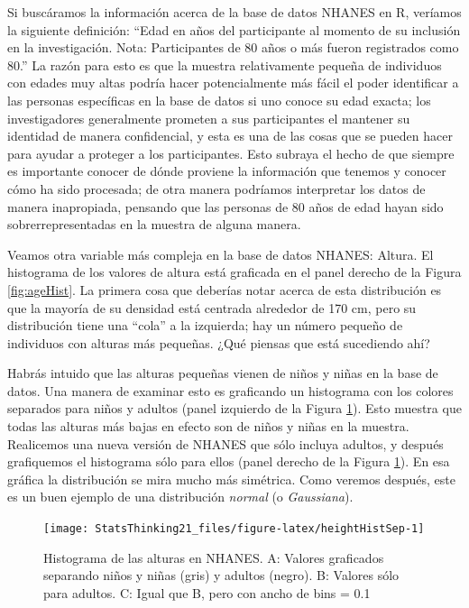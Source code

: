 \documentclass[
  12pt,
]{book}
\begin{document}
Si buscáramos la información acerca de la base de datos NHANES en R, veríamos la siguiente definición: ``Edad en años del participante al momento de su inclusión en la investigación. Nota: Participantes de 80 años o más fueron registrados como 80.'' La razón para esto es que la muestra relativamente pequeña de individuos con edades muy altas podría hacer potencialmente más fácil el poder identificar a las personas específicas en la base de datos si uno conoce su edad exacta; los investigadores generalmente prometen a sus participantes el mantener su identidad de manera confidencial, y esta es una de las cosas que se pueden hacer para ayudar a proteger a los participantes. Esto subraya el hecho de que siempre es importante conocer de dónde proviene la información que tenemos y conocer cómo ha sido procesada; de otra manera podríamos interpretar los datos de manera inapropiada, pensando que las personas de 80 años de edad hayan sido sobrerrepresentadas en la muestra de alguna manera.

Veamos otra variable más compleja en la base de datos NHANES: Altura. El histograma de los valores de altura está graficada en el panel derecho de la Figura \ref{fig:ageHist}. La primera cosa que deberías notar acerca de esta distribución es que la mayoría de su densidad está centrada alrededor de 170 cm, pero su distribución tiene una ``cola'' a la izquierda; hay un número pequeño de individuos con alturas más pequeñas. ¿Qué piensas que está sucediendo ahí?

Habrás intuido que las alturas pequeñas vienen de niños y niñas en la base de datos. Una manera de examinar esto es graficando un histograma con los colores separados para niños y adultos (panel izquierdo de la Figura \ref{fig:heightHistSep}). Esto muestra que todas las alturas más bajas en efecto son de niños y niñas en la muestra. Realicemos una nueva versión de NHANES que sólo incluya adultos, y después grafiquemos el histograma sólo para ellos (panel derecho de la Figura \ref{fig:heightHistSep}). En esa gráfica la distribución se mira mucho más simétrica. Como veremos después, este es un buen ejemplo de una distribución \emph{normal} (o \emph{Gaussiana}).

\begin{figure}
\texttt{[image: StatsThinking21\_files/figure-latex/heightHistSep-1]} \caption{Histograma de las alturas en NHANES. A: Valores graficados separando niños y niñas (gris) y adultos (negro). B: Valores sólo para adultos. C: Igual que B, pero con ancho de bins = 0.1}\label{fig:heightHistSep}
\end{figure}
\end{document}
